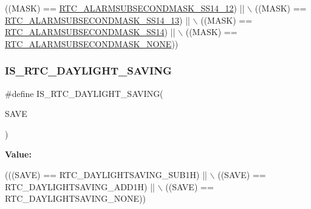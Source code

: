 \begin{DoxyCode}
                                              ((MASK) == 
      \hyperlink{group___r_t_c___alarm___sub___seconds___masks___definitions_ga37c03d1ef098287fa559af1a28bd8ba5}{RTC\_ALARMSUBSECONDMASK\_SS14\_12}) || \(\backslash\)
                                              ((MASK) == 
      \hyperlink{group___r_t_c___alarm___sub___seconds___masks___definitions_gada3b5b45dbdabf604340b0c09bdbdc2c}{RTC\_ALARMSUBSECONDMASK\_SS14\_13}) || \(\backslash\)
                                              ((MASK) == 
      \hyperlink{group___r_t_c___alarm___sub___seconds___masks___definitions_ga91e1225dc11de4ce4bd74eb18fc155f7}{RTC\_ALARMSUBSECONDMASK\_SS14}) || \(\backslash\)
                                              ((MASK) == 
      \hyperlink{group___r_t_c___alarm___sub___seconds___masks___definitions_ga2c3802d48626766a3fc85ad910caea02}{RTC\_ALARMSUBSECONDMASK\_NONE}))
\end{DoxyCode}
\mbox{\label{group___r_t_c___i_s___r_t_c___definitions_ga4922f8f31df54481bc002b16bc1effc3}} 
\subsubsection{\texorpdfstring{I\+S\+\_\+\+R\+T\+C\+\_\+\+D\+A\+Y\+L\+I\+G\+H\+T\+\_\+\+S\+A\+V\+I\+NG}{IS\_RTC\_DAYLIGHT\_SAVING}}
{\footnotesize\ttfamily \#define I\+S\+\_\+\+R\+T\+C\+\_\+\+D\+A\+Y\+L\+I\+G\+H\+T\+\_\+\+S\+A\+V\+I\+NG(\begin{DoxyParamCaption}\item[{}]{S\+A\+VE }\end{DoxyParamCaption})}

{\bfseries Value\+:}
\begin{DoxyCode}
(((SAVE) == RTC\_DAYLIGHTSAVING\_SUB1H) || \(\backslash\)
                                      ((SAVE) == RTC\_DAYLIGHTSAVING\_ADD1H) || \(\backslash\)
                                      ((SAVE) == RTC\_DAYLIGHTSAVING\_NONE))
\end{DoxyCode}
\mbox{\label{group___r_t_c___i_s___r_t_c___definitions_ga597042eec4479e028c32973bc69f4a26}} 
